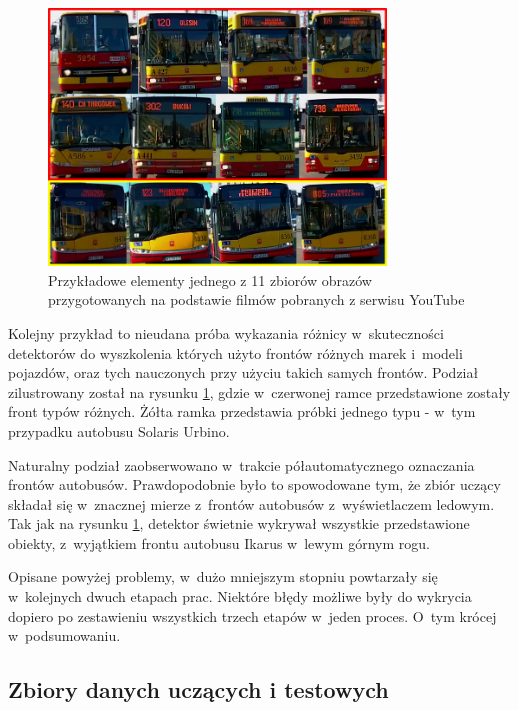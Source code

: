 \begin{figure}[!h]
	\centering
	\includegraphics[width=0.8\textwidth]{img/exp_trainig_data_jJ9}
	\caption{Przykładowe elementy jednego z 11 zbiorów obrazów
		przygotowanych na podstawie
		filmów pobranych z serwisu YouTube}
	\label{fig:jJ9ixBfVR5k_types}
\end{figure}

Kolejny przykład to nieudana próba wykazania różnicy w~skuteczności detektorów
do wyszkolenia których użyto frontów różnych marek i~modeli pojazdów, oraz tych
nauczonych przy użyciu takich samych frontów. Podział zilustrowany został na 
rysunku \ref{fig:jJ9ixBfVR5k_types}, gdzie w~czerwonej ramce przedstawione
zostały front typów różnych. Żółta ramka przedstawia próbki jednego typu - 
w~tym przypadku autobusu Solaris Urbino.

Naturalny podział zaobserwowano w~trakcie półautomatycznego oznaczania frontów
autobusów. Prawdopodobnie było to spowodowane tym, że zbiór uczący składał
się w~znacznej mierze z~frontów autobusów z~wyświetlaczem ledowym. Tak jak na
rysunku \ref{fig:jJ9ixBfVR5k_types}, detektor świetnie wykrywał wszystkie 
przedstawione obiekty, z~wyjątkiem frontu autobusu Ikarus w~lewym górnym rogu.

Opisane powyżej problemy, w~dużo mniejszym stopniu powtarzały się w~kolejnych 
dwuch etapach prac. Niektóre błędy możliwe były do wykrycia dopiero po
zestawieniu wszystkich trzech etapów w~jeden proces. O~tym krócej w~podsumowaniu.

\subsection{Zbiory danych uczących i testowych}

